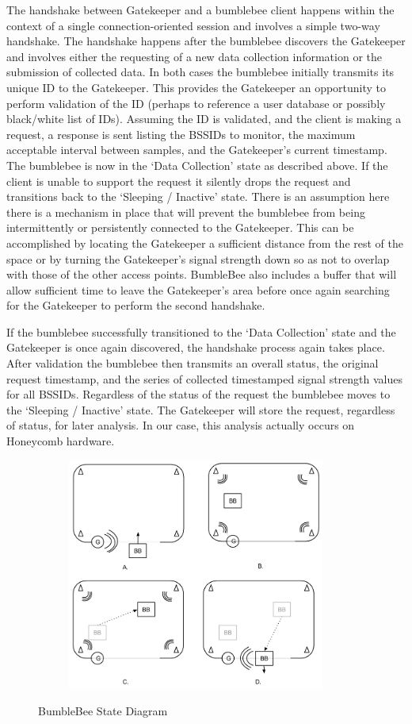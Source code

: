 The handshake between Gatekeeper and a bumblebee client happens within the context of a single connection-oriented session and involves a simple two-way handshake. The handshake happens after the bumblebee discovers the Gatekeeper and involves either the requesting of a new data collection information or the submission of collected data. In both cases the bumblebee initially transmits its unique ID to the Gatekeeper. This provides the Gatekeeper an opportunity to perform validation of the ID (perhaps to reference a user database or possibly black/white list of IDs). Assuming the ID is validated, and the client is making a request, a response is sent listing the BSSIDs to monitor, the maximum acceptable interval between samples, and the Gatekeeper’s current timestamp. The bumblebee is now in the ‘Data Collection’ state as described above. If the client is unable to support the request it silently drops the request and transitions back to the ‘Sleeping / Inactive’ state. There is an assumption here there is a mechanism in place that will prevent the bumblebee from being intermittently or persistently connected to the Gatekeeper. This can be accomplished by locating the Gatekeeper a sufficient distance from the rest of the space or by turning the Gatekeeper's signal strength down so as not to overlap with those of the other access points. BumbleBee also includes a buffer that will allow sufficient time to leave the Gatekeeper's area before once again searching for the Gatekeeper to perform the second handshake.

If the bumblebee successfully transitioned to the ‘Data Collection’ state and the Gatekeeper is once again discovered, the handshake process again takes place. After validation the bumblebee then transmits an overall status, the original request timestamp, and the series of collected timestamped signal strength values for all BSSIDs. Regardless of the status of the request the bumblebee moves to the ‘Sleeping / Inactive’ state. The Gatekeeper will store the request, regardless of status, for later analysis. In our case, this analysis actually occurs on Honeycomb hardware.


\begin{figure}[htb] %
	\begin{center}
		\ \includegraphics[width=4in,height=3in]{BumbleBeeExample.png}
		\caption{BumbleBee State Diagram}
		\label{bumblebestatediagram}
	\end{center}
\end{figure}
